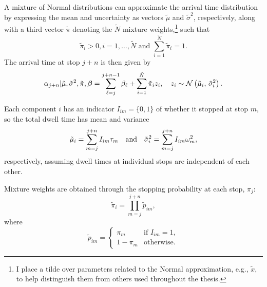 A mixture of Normal distributions can approximate the arrival time distribution \citep{Wang_2012} by expressing the mean and uncertainty as vectors $\tilde\mu$ and $\tilde\sigma^2$, respectively, along with a third vector $\tilde\pi$ denoting the $\tilde N$ mixture weights,\footnote{I place a tilde over parameters related to the Normal approximation, e.g., $\tilde x$, to help distinguish them from others used throughout the thesis.} such that
\begin{equation}
\label{eq:ch5:mixture_weight_spec}
\tilde\pi_i > 0, i = 1, \ldots, \tilde N
\text{ and } \sum_{i=1}^{\tilde N} \tilde\pi_i = 1.
\end{equation}
The arrival time at stop $j + n$ is then given by
\begin{equation}
\label{eq:arrival_time_normal_approx}
\alpha_{j+n} | \tilde\mu, \tilde\sigma^2, \tilde\pi, \boldsymbol\beta =
\sum_{\ell=j}^{j+n-1} \beta_\ell +
\sum_{i=1}^{\tilde N} \tilde\pi_i z_i,\quad
z_i \sim \mathcal{N}\left(\tilde\mu_i,\, \tilde\sigma^2_i\right).
\end{equation}


Each component $i$ has an indicator $I_{im} = \{0,1\}$ of whether it stopped at stop $m$, so the total dwell time has mean and variance
\begin{equation}
\label{eq:mixture_dwell_times}
\tilde\mu_i = \sum_{m=j}^{j+n} I_{im} \tau_m\quad\text{and}\quad
\tilde\sigma_i^2 = \sum_{m=j}^{j+n} I_{im} \omega^2_m,
\end{equation}
respectively, assuming dwell times at individual stops are independent of each other.

Mixture weights are obtained through the stopping probability at each stop, $\pi_j$:
\begin{equation}
\label{eq:ch5:mixture_weights}
\tilde\pi_i = \prod_{m=j}^{j+n} \tilde p_{im},
\end{equation}
where
\begin{equation}
\label{eq:ch5:mixture_weights2}
\tilde p_{im} =
\begin{cases}
\pi_m & \text{if } I_{im} = 1, \\
1 - \pi_m & \text{otherwise.}
\end{cases}
\end{equation}


